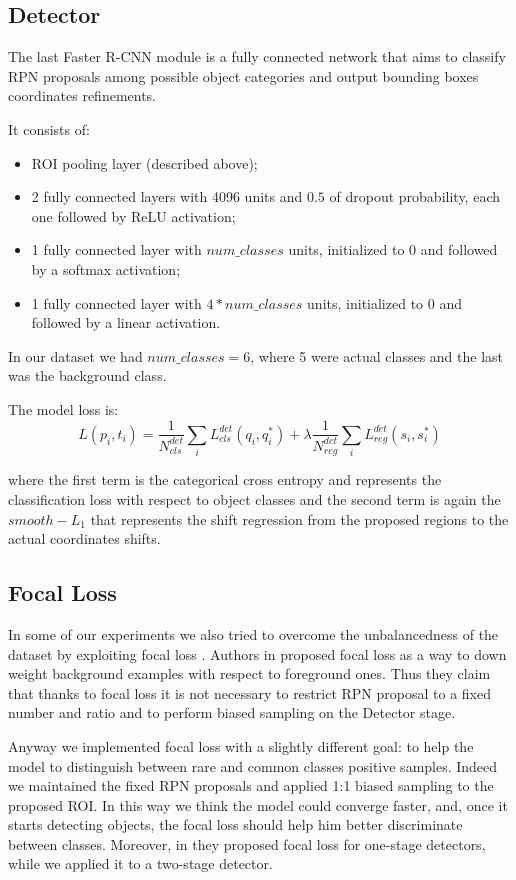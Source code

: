\documentclass[a4paper,10pt]{report}
\begin{document}
\subsection{Detector}\label{subsec:detector}
The last Faster R-CNN module is a fully connected network that aims to classify RPN proposals among possible object categories and output bounding boxes coordinates refinements.

It consists of:
\begin{itemize}
    \item ROI pooling layer (described above);
    \item 2 fully connected layers with 4096 units and $0.5$ of dropout probability, each one followed by ReLU activation;
    \item 1 fully connected layer with $num\_classes$ units, initialized to 0 and followed by a softmax activation;
    \item 1 fully connected layer with $4*num\_classes$ units, initialized to 0 and followed by a linear activation.
\end{itemize}
In our dataset we had $num\_classes=6$, where 5 were actual classes and the last was the background class.

The model loss is:
\[L({p_i}, {t_i}) = \dfrac{1}{N_{cls}^{det}} \sum_{i} L_{cls}^{det}(q_i, q_i^*) + \lambda \dfrac{1}{N_{reg}^{det}} \sum_{i}L_{reg}^{det}(s_i, s_i^*) \]

where the first term is the categorical cross entropy and represents the classification loss with respect to object classes and the second term is again the $smooth-L_1$ that represents the shift regression from the proposed regions to the actual coordinates shifts.

\subsection{Focal Loss}\label{subsec:focal-loss}
In some of our experiments we also tried to overcome the unbalancedness of the dataset by exploiting focal loss \cite{focal-loss}.
Authors in \cite{focal-loss} proposed focal loss as a way to down weight background examples with respect to foreground ones. Thus they claim that thanks to focal loss it is not necessary to restrict RPN proposal to a fixed number and ratio and to perform biased sampling on the Detector stage.

Anyway we implemented focal loss with a slightly different goal: to help the model to distinguish between rare and common classes positive samples. Indeed we maintained the fixed RPN proposals and applied 1:1 biased sampling to the proposed ROI. In this way we think the model could converge faster, and, once it starts detecting objects, the focal loss should help him better discriminate between classes.
Moreover, in \cite{focal-loss} they proposed focal loss for one-stage detectors, while we applied it to a two-stage detector.
\end{document}
